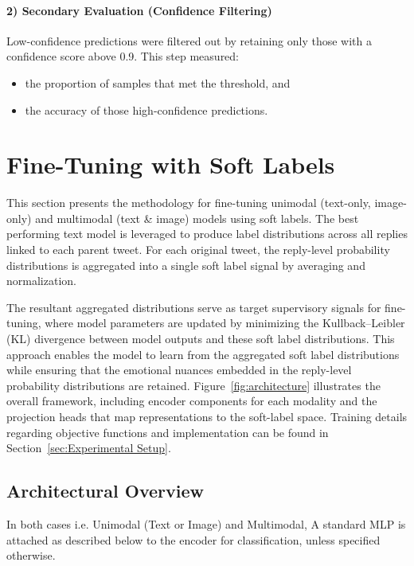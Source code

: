 \paragraph{2) Secondary Evaluation (Confidence Filtering)} 
Low-confidence predictions were filtered out by retaining only those with a confidence score above 0.9. This step measured: 
\begin{itemize} 
    \item the proportion of samples that met the threshold, and 
    \item the accuracy of those high-confidence predictions. 
\end{itemize}



\section{Fine-Tuning with Soft Labels} 
\label{sec:finetuning}

This section presents the methodology for fine-tuning unimodal (text-only, image-only) and multimodal (text \& image) models using soft labels. The best performing text model is leveraged to produce label distributions across all replies linked to each parent tweet. For each original tweet, the reply-level probability distributions is aggregated into a single soft label signal by averaging and normalization.
\newline

The resultant aggregated distributions serve as target supervisory signals for fine-tuning, where model parameters are updated by minimizing the Kullback–Leibler (KL) divergence between model outputs and these soft label distributions. This approach enables the model to learn from the aggregated soft label distributions while ensuring that the emotional nuances embedded in the reply-level probability distributions are retained. Figure~\ref{fig:architecture} illustrates the overall framework, including encoder components for each modality and the projection heads that map representations to the soft-label space. Training details regarding objective functions and implementation can be found in Section~\ref{sec:Experimental Setup}.


\subsection{Architectural Overview}
In both cases i.e. Unimodal (Text or Image) and Multimodal, A standard MLP is attached as described below to the encoder for classification, unless specified otherwise. 

